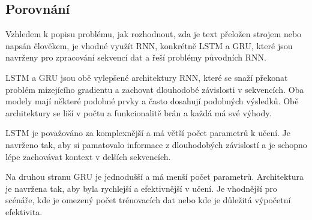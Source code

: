\subsection{Porovnání}
Vzhledem k popisu problému, jak rozhodnout, zda je text přeložen strojem nebo napsán člověkem, je vhodné využít RNN, konkrétně LSTM a GRU, které jsou navrženy pro zpracování sekvencí dat a řeší problémy původních RNN.\@

LSTM a GRU jsou obě vylepšené architektury RNN, které se snaží překonat problém mizejícího gradientu a zachovat dlouhodobé závislosti v sekvencích.
Oba modely mají některé podobné prvky a často dosahují podobných výsledků.
Obě architektury se liší v počtu a funkcionalitě brán a každá má své výhody.

LSTM je považováno za komplexnější a má větší počet parametrů k učení.
Je navrženo tak, aby si pamatovalo informace z dlouhodobých závislostí a je schopno lépe zachovávat kontext v delších sekvencích.

Na druhou stranu GRU je jednodušší a má menší počet parametrů.
Architektura je navržena tak, aby byla rychlejší a efektivnější v učení.
Je vhodnější pro scénáře, kde je omezený počet trénovacích dat nebo kde je důležitá výpočetní efektivita.
\endinput